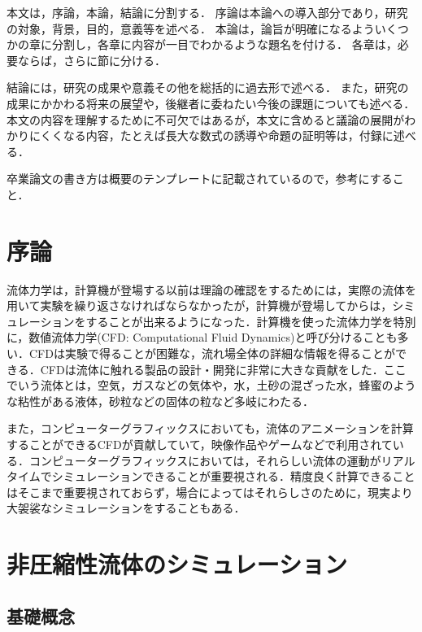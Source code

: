 \documentclass[a4j,12pt]{jreport}
\begin{document}
本文は，序論，本論，結論に分割する．
序論は本論への導入部分であり，研究の対象，背景，目的，意義等を述べる．
本論は，論旨が明確になるよういくつかの章に分割し，各章に内容が一目でわかるような題名を付ける．
各章は，必要ならば，さらに節に分ける．


結論には，研究の成果や意義その他を総括的に過去形で述べる．
また，研究の成果にかかわる将来の展望や，後継者に委ねたい今後の課題についても述べる．
本文の内容を理解するために不可欠ではあるが，本文に含めると議論の展開がわかりにくくなる内容，たとえば長大な数式の誘導や命題の証明等は，付録に述べる．


卒業論文の書き方は概要のテンプレートに記載されているので，参考にすること．



\chapter{序論} \label{chapter:2}

流体力学は，計算機が登場する以前は理論の確認をするためには，実際の流体を用いて実験を繰り返さなければならなかったが，計算機が登場してからは，シミュレーションをすることが出来るようになった．計算機を使った流体力学を特別に，数値流体力学(CFD: Computational Fluid Dynamics)と呼び分けることも多い．CFDは実験で得ることが困難な，流れ場全体の詳細な情報を得ることができる．CFDは流体に触れる製品の設計・開発に非常に大きな貢献をした．ここでいう流体とは，空気，ガスなどの気体や，水，土砂の混ざった水，蜂蜜のような粘性がある液体，砂粒などの固体の粒など多岐にわたる．

また，コンピューターグラフィックスにおいても，流体のアニメーションを計算することができるCFDが貢献していて，映像作品やゲームなどで利用されている．コンピューターグラフィックスにおいては，それらしい流体の運動がリアルタイムでシミュレーションできることが重要視される．精度良く計算できることはそこまで重要視されておらず，場合によってはそれらしさのために，現実より大袈裟なシミュレーションをすることもある．
\chapter{非圧縮性流体のシミュレーション} \label{chapter:3}
\section{基礎概念}
\end{document}
